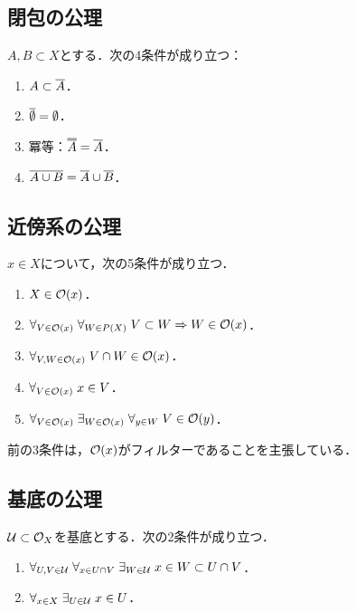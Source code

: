 \documentclass[uplatex,dvipdfmx]{jsreport}
\begin{document}
\subsection{閉包の公理}

\begin{proposition}
    $A,B\subset X$とする．次の4条件が成り立つ：
    \begin{enumerate}
        \item $A\subset\overline{A}$．
        \item $\overline{\emptyset}=\emptyset$．
        \item 冪等：$\oo{A}=\o{A}$．
        \item $\overline{A\cup B}=\overline{A}\cup\overline{B}$．
    \end{enumerate}
\end{proposition}

\subsection{近傍系の公理}

\begin{proposition}
    $x\in X$について，次の5条件が成り立つ．
    \begin{enumerate}
        \item $X\in\mathcal{O}(x)$．
        \item $\forall_{V\in\mathcal{O}(x)}\;\forall_{W\in P(X)}\;V\subset W\Rightarrow W\in\mathcal{O}(x)$．
        \item $\forall_{V,W\in\mathcal{O}(x)}\;V\cap W\in\mathcal{O}(x)$．
        \item $\forall_{V\in\mathcal{O}(x)}\;x\in V$．
        \item $\forall_{V\in\mathcal{O}(x)}\;\exists_{W\in\mathcal{O}(x)}\;\forall_{y\in W}\;V\in\mathcal{O}(y)$．
    \end{enumerate}
    前の3条件は，$\mathcal{O}(x)$がフィルターであることを主張している．
\end{proposition}

\subsection{基底の公理}

\begin{proposition}
    $\mathcal{U}\subset\mathcal{O}_X$を基底とする．次の2条件が成り立つ．
    \begin{enumerate}
        \item $\forall_{U,V\in\mathcal{U}}\;\forall_{x\in U\cap V}\;\exists_{W\in\mathcal{U}}\;x\in W\subset U\cap V$．
        \item $\forall_{x\in X}\;\exists_{U\in\mathcal{U}}\;x\in U$．
    \end{enumerate}
\end{proposition}
\end{document}
